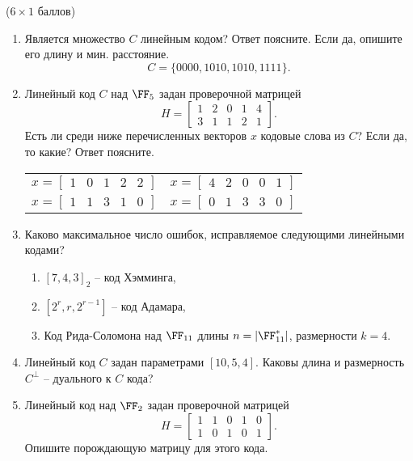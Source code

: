 \documentclass[12pt,a4paper]{scrartcl}
\newcounter{auf}
\newcommand{\auf}[2]
{
\stepcounter{auf}{\textbf{Задание} \textbf{\arabic{auf}} } ({#1} баллов) \vspace{3pt}

#2

\newpage %
}
\begin{document}
\auf{$6 \times 1 $}{%

\begin{enumerate}[1]
	\setlength\itemsep{13em}
	\item Является множество $C$ линейным кодом? Ответ поясните. Если да, опишите его длину и мин. расстояние.
	\[
		C = \{ 0000, 1010, 1010, 1111 \}.
	\]
	\item Линейный код $C$ над $\FF_5$  задан проверочной матрицей
	\[
		H = \begin{bmatrix}
		1&2&0&1&4\\ 
		3&1&1&2&1
		\end{bmatrix}.
	\]
	Есть ли среди ниже перечисленных векторов $x$ кодовые слова из $C$? Если да, то какие? Ответ поясните. \\
	
	\begin{tabular}{ p{7cm} p{7cm}  }
	$x = \left[ \begin {array}{ccccc} 1&0&1&2&2\end {array} \right]  $ 	 & $x = \left[ \begin {array}{ccccc} 4&2&0&0&1\end {array} \right]  $ \\[3ex]
		$x = \left[ \begin {array}{ccccc} 1&1&3&1&0\end {array} \right] $ & $x = \left[ \begin {array}{ccccc} 0&1&3&3&0\end {array} \right] $ 
	\end{tabular}

	\item Каково максимальное число ошибок, исправляемое следующими линейными кодами?
	\begin{enumerate}
		\setlength\itemsep{1em}
		\item $[7,4,3]_2$ -- код Хэмминга,
		\item $[2^r, r, 2^{r-1}]$ -- код Адамара,
		\item Код Рида-Соломона над $\FF_{11}$ длины $n = |\FF^*_{11}|$, размерности $k = 4$.
	\end{enumerate}	

	\item Линейный код $C$ задан параметрами $[10, 5, 4]$. Каковы длина и размерность $C^\perp$ -- дуального к $C$ кода?

	\item Линейный код над $\FF_2$ задан проверочной матрицей 	
	\[
	H = \begin{bmatrix}
		1&1&0&1&0\\ 
		1&0&1&0&1
	\end{bmatrix}.
	\]
	Опишите порождающую матрицу для этого кода. 
	

\end{enumerate}}
\end{document}
